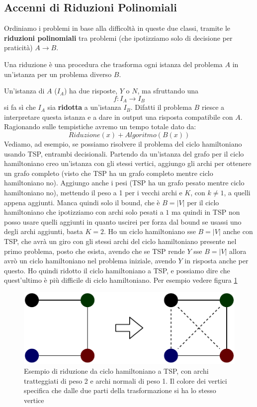 \subsection{Accenni di Riduzioni Polinomiali}
Ordiniamo i problemi in base alla difficoltà in queste due classi, tramite le
\textbf{riduzioni polinomiali} tra problemi (che ipotizziamo solo di decisione per praticità) $A\to B$.
\begin{definizione}
  Una riduzione è una procedura che trasforma ogni istanza del problema $A$ in un'istanza per un problema diverso $B$.
\end{definizione}
Un'istanza di $A$ ($I_A$) ha due risposte, $Y$ o $N$, ma sfruttando una \[f:I_A\to I_B\] si fa sì che $I_A$ sia \textbf{ridotta} a un'istanza $I_B$. Difatti il problema $B$ riesce a interpretare questa istanza e a dare in output una risposta compatibile con $A$.\\ Ragionando sulle tempistiche avremo un tempo totale dato da:
\[Riduzione(x) + Algoritmo(B(x))\]
Vediamo, ad esempio, se possiamo risolvere il problema del ciclo hamiltoniano
usando TSP, entrambi decisionali. Partendo da un'istanza del grafo per il ciclo
hamiltoniano creo un'istanza con gli stessi vertici, aggiungo gli archi per
ottenere un grafo completo (visto che TSP ha un grafo completo mentre ciclo
hamiltoniano no). Aggiungo anche i pesi (TSP ha un grafo pesato mentre ciclo
hamiltoniano no), mettendo il peso a 1 per i vecchi archi
e $K$, con $k\neq 1$, a quelli appena aggiunti. Manca quindi
solo il bound, che è $B=|V|$ per il ciclo hamiltoniano che ipotizziamo con archi
solo pesati a $1$ ma quindi in TSP non posso usare quelli aggiunti in quanto
uscirei per forza dal bound se usassi uno degli archi aggiunti, basta $K=2$. Ho
un ciclo hamiltoniano sse $B=|V|$ anche con TSP, che avrà un giro con gli stessi
archi del ciclo hamiltoniano presente nel primo problema, posto che esista,
avendo che se TSP rende $Y$ sse $B=|V|$ allora avrò un ciclo hamiltoniano nel
problema iniziale, avendo $Y$ in risposta anche per questo. Ho quindi ridotto il
ciclo hamiltoniano a TSP, e possiamo dire che quest'ultimo è più difficile di
ciclo hamiltoniano. Per esempio vedere figura \ref{fig:htsp}
\begin{figure}
  \centering
  \includegraphics[scale = 0.9]{img/rid.pdf}
  \caption{Esempio di riduzione da ciclo hamiltoniano a TSP, con archi
    tratteggiati di peso 2 e archi normali di peso 1. Il colore dei vertici
    specifica che dalle due parti della trasformazione si ha lo stesso vertice}
  \label{fig:htsp}
\end{figure}
